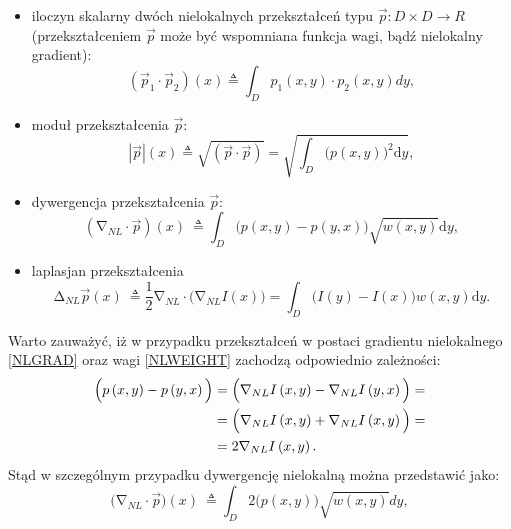 \documentclass[a4paper,12pt,twoside,openany]{report}
\begin{document}
\begin{itemize}
\item
iloczyn skalarny dwóch nielokalnych przekształceń typu $\overrightarrow{p}:D \times D \longrightarrow R$ (przekształceniem $\overrightarrow{p}$ może być wspomniana funkcja wagi, bądź nielokalny gradient):
\begin{equation}
\left({\overrightarrow{p}}_1\cdot {\overrightarrow{p}}_2\right)(x)\triangleq \int_D{p_1(x,y)\cdot p_2\left(x,y\right)dy}
\label{NLPRODUCT}
,
\end{equation}
\item
moduł przekształcenia $\overrightarrow{p}$:
\begin{equation}
\left|\overrightarrow{p}\right|\left(x\right)\triangleq \sqrt{(\overrightarrow{p}\cdot \overrightarrow{p})}=\sqrt{\int_D{{\big(p(x,y)\big)}^2\mathrm{d}y}}
\label{NLMOD}
,
\end{equation}
\item
dywergencja przekształcenia $\overrightarrow{p}$:
\begin{equation}
({\mathrm{\nabla }}_{NL}\cdot \overrightarrow{p})(x)\ \triangleq \int_D{\big(p\left(x,y\right)-p\left(y,x\right)\big)\sqrt{w(x,y)}\mathrm{d}y}
\label{NLDIV}
,
\end{equation}
\item
laplasjan przekształcenia
\begin{equation}
{\mathrm{\Delta }}_{NL}\overrightarrow{p}(x)\ \triangleq \frac{1}{2}{\mathrm{\nabla }}_{NL}\cdot \Big({\mathrm{\nabla }}_{NL}I\left(x\right)\Big)=\int_D{\Big(I\left(y\right)-I\left(x\right)\Big)w(x,y)\mathrm{d}y}
\label{NLLAP}
.
\end{equation}
\end{itemize}
Warto zauważyć, iż w przypadku przekształceń w postaci gradientu nielokalnego \eqref{NLGRAD} oraz wagi \eqref{NLWEIGHT} zachodzą odpowiednio zależności:
\begin{align}
\Big(p\left(x,y\right)-p\left(y,x\right)\Big) &= \Big({\mathrm{\nabla }}_{NL}I\left(x,y\right)-{\mathrm{\nabla }}_{NL}I\left(y,x\right)\Big)  \notag =\\ 
&= \Big({\mathrm{\nabla }}_{NL}I\left(x,y\right)+{\mathrm{\nabla }}_{NL}I\left(x,y\right)\Big) \notag =\\
&=2{\mathrm{\nabla }}_{NL}I\left(x,y\right) .
\label{NLPOM}
\end{align}
Stąd w szczególnym przypadku dywergencję nielokalną można przedstawić jako: 
\begin{equation}
\Big({\mathrm{\nabla }}_{NL}\cdot \overrightarrow{p}\Big)(x)\ \triangleq \int_D{2\Big(p\left(x,y\right)\Big)\sqrt{w(x,y)}dy}
\label{NLDIVSMART}
,
\end{equation}
\end{document}

